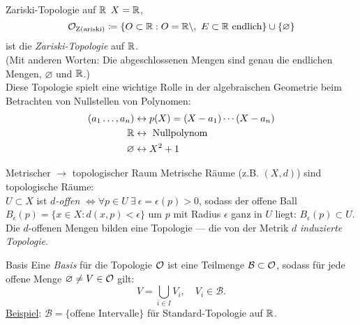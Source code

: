 \clearpage

\begin{example}{Zariski-Topologie auf $ \mathbb{R} $}
  $ X = \mathbb{R} $,
  \begin{equation*}
    \mathcal{O}_\text{Z(ariski)} \coloneqq \{ O \subset \mathbb{R} : O = \mathbb{R} \setminus, \ E \subset \mathbb{R} \text{ endlich} \} \cup \{ \varnothing \}
  \end{equation*}
  ist die \emph{Zariski-Topologie} auf $ \mathbb{R} $. \\
  (Mit anderen Worten: Die abgeschlossenen Mengen sind genau die endlichen Mengen, $ \varnothing $ und $ \mathbb{R} $.) \\
  Diese Topologie spielt eine wichtige Rolle in der algebraischen Geometrie beim Betrachten von Nullstellen von Polynomen: \\
  \begin{align*}
    (a_1 \dots, a_n) &\leftrightarrow p(X) = (X-a_1)\cdots(X-a_n) \\
     \mathbb{R} &\leftrightarrow \text{ Nullpolynom} \\
     \varnothing &\leftrightarrow X^2+1
  \end{align*}
\end{example}

\begin{definition}{Metrischer $ \to $ topologischer Raum}
  Metrische Räume (z.B. $ (X, d) $) sind topologische Räume: \\
  $ U \subset X $ ist \emph{$ d $-offen} $ \Leftrightarrow \forall p \in U \ \exists \ \epsilon = \epsilon(p) > 0 $, sodass der offene Ball $ B_\epsilon(p) = \{ x \in X : d(x,p) < \epsilon \} $ um $ p $ mit Radius $ \epsilon $ ganz in $ U $ liegt: $ B_\epsilon(p) \subset U $. \\
  Die $ d $-offenen Mengen bilden eine Topologie --- die von der Metrik $ d $ \emph{induzierte Topologie}.
\end{definition}

\begin{definition}{Basis}
  Eine \emph{Basis} für die Topologie $ \mathcal{O} $ ist eine Teilmenge $ \mathcal{B} \subset \mathcal{O} $, sodass für jede offene Menge $ \varnothing \neq V \in \mathcal{O} $ gilt:
  \begin{equation*}
    V = \bigcup_{i \in I}V_i, \quad V_i \in \mathcal{B}\text{.}
  \end{equation*}
  \underline{Beispiel}: $ \mathcal{B} = \{ \text{offene Intervalle} \} $ für Standard-Topologie auf $ \mathbb{R} $.
\end{definition}

